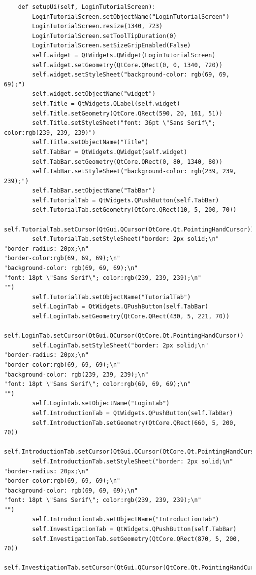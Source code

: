 \documentclass[12pt]{article}
\begin{document}
\begin{lstlisting}
    def setupUi(self, LoginTutorialScreen):
        LoginTutorialScreen.setObjectName("LoginTutorialScreen")
        LoginTutorialScreen.resize(1340, 723)
        LoginTutorialScreen.setToolTipDuration(0)
        LoginTutorialScreen.setSizeGripEnabled(False)
        self.widget = QtWidgets.QWidget(LoginTutorialScreen)
        self.widget.setGeometry(QtCore.QRect(0, 0, 1340, 720))
        self.widget.setStyleSheet("background-color: rgb(69, 69, 69);")
        self.widget.setObjectName("widget")
        self.Title = QtWidgets.QLabel(self.widget)
        self.Title.setGeometry(QtCore.QRect(590, 20, 161, 51))
        self.Title.setStyleSheet("font: 36pt \"Sans Serif\"; color:rgb(239, 239, 239)")
        self.Title.setObjectName("Title")
        self.TabBar = QtWidgets.QWidget(self.widget)
        self.TabBar.setGeometry(QtCore.QRect(0, 80, 1340, 80))
        self.TabBar.setStyleSheet("background-color: rgb(239, 239, 239);")
        self.TabBar.setObjectName("TabBar")
        self.TutorialTab = QtWidgets.QPushButton(self.TabBar)
        self.TutorialTab.setGeometry(QtCore.QRect(10, 5, 200, 70))
        self.TutorialTab.setCursor(QtGui.QCursor(QtCore.Qt.PointingHandCursor))
        self.TutorialTab.setStyleSheet("border: 2px solid;\n"
"border-radius: 20px;\n"
"border-color:rgb(69, 69, 69);\n"
"background-color: rgb(69, 69, 69);\n"
"font: 18pt \"Sans Serif\"; color:rgb(239, 239, 239);\n"
"")
        self.TutorialTab.setObjectName("TutorialTab")
        self.LoginTab = QtWidgets.QPushButton(self.TabBar)
        self.LoginTab.setGeometry(QtCore.QRect(430, 5, 221, 70))
        self.LoginTab.setCursor(QtGui.QCursor(QtCore.Qt.PointingHandCursor))
        self.LoginTab.setStyleSheet("border: 2px solid;\n"
"border-radius: 20px;\n"
"border-color:rgb(69, 69, 69);\n"
"background-color: rgb(239, 239, 239);\n"
"font: 18pt \"Sans Serif\"; color:rgb(69, 69, 69);\n"
"")
        self.LoginTab.setObjectName("LoginTab")
        self.IntroductionTab = QtWidgets.QPushButton(self.TabBar)
        self.IntroductionTab.setGeometry(QtCore.QRect(660, 5, 200, 70))
        self.IntroductionTab.setCursor(QtGui.QCursor(QtCore.Qt.PointingHandCursor))
        self.IntroductionTab.setStyleSheet("border: 2px solid;\n"
"border-radius: 20px;\n"
"border-color:rgb(69, 69, 69);\n"
"background-color: rgb(69, 69, 69);\n"
"font: 18pt \"Sans Serif\"; color:rgb(239, 239, 239);\n"
"")
        self.IntroductionTab.setObjectName("IntroductionTab")
        self.InvestigationTab = QtWidgets.QPushButton(self.TabBar)
        self.InvestigationTab.setGeometry(QtCore.QRect(870, 5, 200, 70))
        self.InvestigationTab.setCursor(QtGui.QCursor(QtCore.Qt.PointingHandCursor))

\end{lstlisting}
\end{document}
